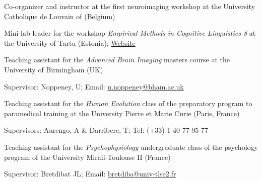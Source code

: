 Co-organizer and instructor at the first neuroimaging workshop at the University Catholique de Louvain of (Belgium) 

Mini-lab leader for the workshop \textit{Empirical Methods in Cognitive Linguistics 8} at the University of Tartu (Estonia); 
\href{https://sisu.ut.ee/emcl8tartu/emcl-organising-committee}{Website}

Teaching assistant for the \textit{Advanced Brain Imaging} masters course at the University of Birmingham (UK)

Supervisor: Noppeney, U; Email: \href{mailto:u.noppeney@bham.ac.uk}{u.noppeney@bham.ac.uk}

Teaching assistant for the \textit{Human Evolution} class of the preparatory program to paramedical training at the University Pierre et Marie Curie (Paris, France)

Supervisors: Aurengo, A \& Darribere, T; Tel: (+33) 1 40 77 95 77

Teaching assistant for the \textit{Psychophysiology} undergraduate class of the psychology program of the University Mirail-Toulouse II (France)

Supervisor: Bretdibat JL; Email: \href{mailto:bretdiba@univ-tlse2.fr}{bretdiba@univ-tlse2.fr}
